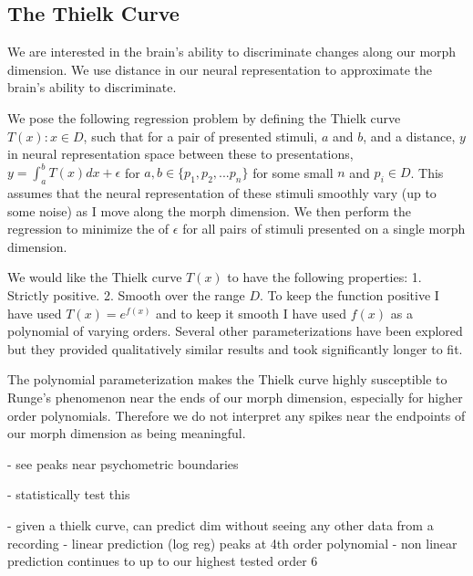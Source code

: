 \subsection{The Thielk Curve}



We are interested in the brain's ability to discriminate changes along our morph dimension. We use distance in our neural representation to approximate the brain's ability to discriminate. 

We pose the following regression problem by defining the Thielk curve
$T(x): x \in D$, such that for a pair of presented stimuli, $a$ and $b$, and a distance, $y$ in neural representation space between these to presentations, $y = \int_a^bT(x)dx + \epsilon$ for $a,b \in \{p_1, p_2, ... p_n\}$ for some small $n$ and $p_i \in D$. This assumes that the neural representation of these stimuli smoothly vary (up to some noise) as I move along the morph dimension. We then perform the regression to minimize the \MSE of $\epsilon$ for all pairs of stimuli presented on a single morph dimension.

We would like the Thielk curve $T(x)$ to have the following properties: 1. Strictly positive. 2. Smooth over the range $D$.
To keep the function positive I have used $T(x)=e^{f(x)}$ and to keep it smooth I have used $f(x)$ as a polynomial of varying orders.
Several other parameterizations have been explored but they provided qualitatively similar results and took significantly longer to fit.

The polynomial parameterization makes the Thielk curve highly susceptible to Runge's phenomenon near the ends of our morph dimension, especially for higher order polynomials. Therefore we do not interpret any spikes near the endpoints of our morph dimension as being meaningful.

- see peaks near psychometric boundaries

- statistically test this

- given a thielk curve, can predict dim without seeing any other data from a recording
- linear prediction (log reg) peaks at 4th order polynomial
- non linear prediction continues to up to our highest tested order 6